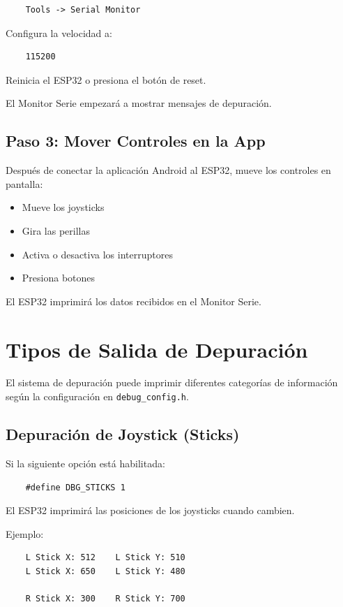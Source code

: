 \begin{verbatim}
    Tools -> Serial Monitor
\end{verbatim}

Configura la velocidad a:

\begin{verbatim}
    115200
\end{verbatim}

Reinicia el ESP32 o presiona el botón de reset.

El Monitor Serie empezará a mostrar mensajes de depuración.

\subsection{Paso 3: Mover Controles en la App}

Después de conectar la aplicación Android al ESP32, mueve los controles en pantalla:

\begin{itemize}
    \item Mueve los joysticks
    \item Gira las perillas
    \item Activa o desactiva los interruptores
    \item Presiona botones
\end{itemize}

El ESP32 imprimirá los datos recibidos en el Monitor Serie.

\section{Tipos de Salida de Depuración}

El sistema de depuración puede imprimir diferentes categorías de información según la configuración en \texttt{debug\_config.h}.

\subsection{Depuración de Joystick (Sticks)}

Si la siguiente opción está habilitada:

\begin{verbatim}
    #define DBG_STICKS 1
\end{verbatim}

El ESP32 imprimirá las posiciones de los joysticks cuando cambien.

Ejemplo:

\begin{verbatim}
    L Stick X: 512    L Stick Y: 510
    L Stick X: 650    L Stick Y: 480

    R Stick X: 300    R Stick Y: 700
\end{verbatim}

